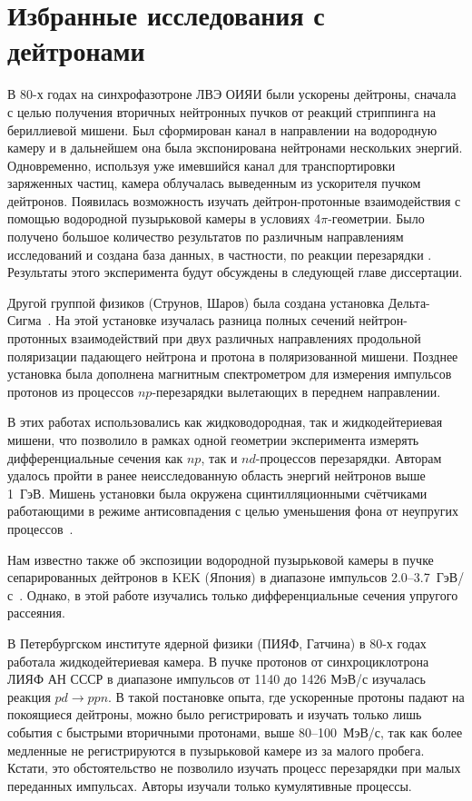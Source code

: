 \section{Избранные исследования с дейтронами}
В 80-х годах на синхрофазотроне ЛВЭ ОИЯИ были ускорены дейтроны, сначала с целью
получения вторичных нейтронных пучков от реакций стриппинга на бериллиевой
мишени. Был сформирован  канал в направлении на водородную камеру и в дальнейшем
она была экспонирована нейтронами нескольких энергий. Одновременно, используя
уже имевшийся канал для транспортировки заряженных частиц, камера облучалась
выведенным из ускорителя пучком дейтронов. Появилась возможность изучать
дейтрон-протонные взаимодействия с помощью водородной пузырьковой камеры в
условиях 4$\pi$-геометрии. Было получено большое количество результатов по
различным направлениям исследований и создана база данных, в частности, по
реакции перезарядки \dpchex. Результаты этого эксперимента будут обсуждены в
следующей главе диссертации.

Другой группой физиков (Струнов, Шаров) была создана установка
Дельта-Сигма~\cite{shar00}. На этой установке изучалась разница полных сечений
нейтрон-протонных взаимодействий  при двух различных направлениях продольной
поляризации падающего нейтрона и протона в поляризованной мишени. Позднее
установка была дополнена магнитным спектрометром для измерения импульсов
протонов из процессов $np$-перезарядки вылетающих в переднем направлении.

В этих работах использовались как жидководородная, так и жидкодейтериевая
мишени, что позволило в рамках одной геометрии эксперимента измерять
дифференциальные сечения как $np$, так и $nd$-процессов перезарядки. Авторам
удалось пройти в ранее неисследованную область энергий нейтронов выше
1~ГэВ. Мишень установки была окружена сцинтилляционными счётчиками работающими в
режиме антисовпадения с целью уменьшения фона от неупругих
процессов~\cite{shar04}.

Нам известно также об экспозиции водородной пузырьковой камеры в пучке
сепарированных дейтронов в KEK (Япония) в диапазоне импульсов
2.0--3.7~ГэВ/с~\cite{kata85}. Однако, в этой работе изучались только
дифференциальные сечения упругого \dpela рассеяния.

В Петербургском институте ядерной физики (ПИЯФ, Гатчина) в 80-х годах работала
жидкодейтериевая камера. В пучке протонов от синхроциклотрона ЛИЯФ АН СССР в
диапазоне импульсов от 1140 до 1426 МэВ/с изучалась~\cite{and85} реакция
$pd \rightarrow ppn$. В такой постановке опыта, где ускоренные протоны падают на
покоящиеся дейтроны, можно было регистрировать и изучать только лишь события с
быстрыми вторичными протонами, выше 80--100~МэВ/с, так как более медленные не
регистрируются в пузырьковой камере из за малого пробега. Кстати, это
обстоятельство не позволило изучать процесс перезарядки при малых переданных
импульсах. Авторы изучали только кумулятивные процессы.

